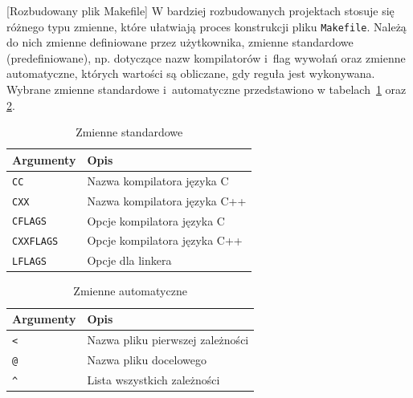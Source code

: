 \begin{example}{[Rozbudowany plik Makefile]} \label{ex:rozbudowany}
W bardziej rozbudowanych projektach stosuje się różnego typu zmienne, które ułatwiają proces konstrukcji pliku \lstinline[style=MyBashStyle]{Makefile}. Należą do nich zmienne definiowane przez użytkownika, zmienne standardowe (predefiniowane), np. dotyczące nazw kompilatorów i~flag wywołań oraz zmienne automatyczne, których wartości są obliczane, gdy reguła jest wykonywana. Wybrane zmienne standardowe i~automatyczne przedstawiono w tabelach~\ref{tab:zmiennestandardowe} oraz \ref{tab:zmienneautomatyczne}.

\begin{table}[h!]
\centering
\caption{Zmienne standardowe}
\setlength{\arrayrulewidth}{1pt}
\setlength{\tabcolsep}{6pt}
\renewcommand{\arraystretch}{1.2}
\begin{tabular}{ |p{}|p{}|}
\hline \rowcolor{gray}
\textbf{Argumenty} & \textbf{Opis} \\ \hline
\mbox{\lstinline[style=MyBashStyle]{CC}} & Nazwa kompilatora języka C \\ \hline
\mbox{\lstinline[style=MyBashStyle]{CXX}} & Nazwa kompilatora języka C++ \\ \hline
\mbox{\lstinline[style=MyBashStyle]{CFLAGS}} & Opcje kompilatora języka C \\ \hline
\mbox{\lstinline[style=MyBashStyle]{CXXFLAGS}} & Opcje kompilatora języka C++  \\ \hline
\mbox{\lstinline[style=MyBashStyle]{LFLAGS}} & Opcje dla linkera  \\ \hline
\end{tabular}
\label{tab:zmiennestandardowe}
\end{table}


\begin{table}[h!]
\centering
\caption{Zmienne automatyczne}
\setlength{\arrayrulewidth}{1pt}
\setlength{\tabcolsep}{6pt}
\renewcommand{\arraystretch}{1.2}
\begin{tabular}{ |p{}|p{}|}
\hline \rowcolor{gray}
\textbf{Argumenty} & \textbf{Opis} \\ \hline
\mbox{\lstinline[style=MyBashStyle]{<}} & Nazwa pliku pierwszej zależności \\ \hline
\mbox{\lstinline[style=MyBashStyle]{@}} & Nazwa pliku docelowego \\ \hline
\mbox{\lstinline[style=MyBashStyle]{^}} & Lista wszystkich zależności \\ \hline
\end{tabular}
\label{tab:zmienneautomatyczne}
\end{table}


\end{example}
